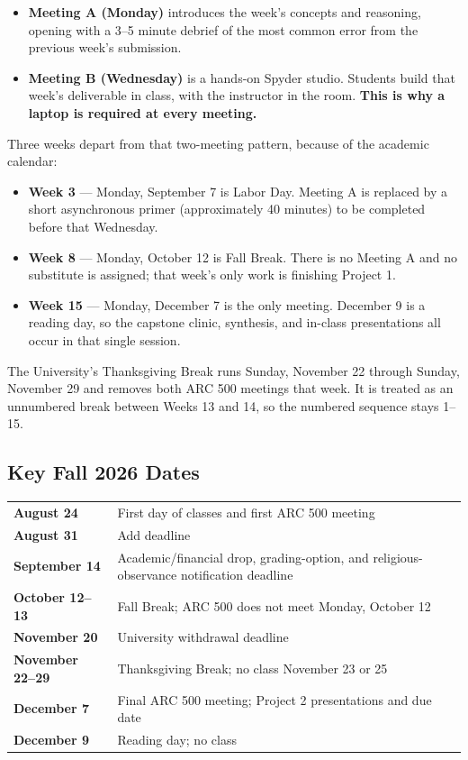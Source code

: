 \documentclass[11pt]{article}
\begin{document}
\begin{itemize}
  \item \textbf{Meeting A (Monday)} introduces the week's concepts and reasoning, opening with
        a 3--5 minute debrief of the most common error from the previous week's submission.
  \item \textbf{Meeting B (Wednesday)} is a hands-on Spyder studio. Students build that week's
        deliverable in class, with the instructor in the room. \textbf{This is why a laptop is
        required at every meeting.}
\end{itemize}

Three weeks depart from that two-meeting pattern, because of the academic calendar:

\begin{itemize}
  \item \textbf{Week 3} --- Monday, September 7 is Labor Day. Meeting A is replaced by a short
        asynchronous primer (approximately 40 minutes) to be completed before that Wednesday.
  \item \textbf{Week 8} --- Monday, October 12 is Fall Break. There is no Meeting A and no
        substitute is assigned; that week's only work is finishing Project 1.
  \item \textbf{Week 15} --- Monday, December 7 is the only meeting. December 9 is a reading
        day, so the capstone clinic, synthesis, and in-class presentations all occur in that
        single session.
\end{itemize}

\newpage
The University's Thanksgiving Break runs Sunday, November 22 through Sunday, November 29 and
removes both ARC 500 meetings that week. It is treated as an unnumbered break between Weeks 13
and 14, so the numbered sequence stays 1--15.

\subsection*{Key Fall 2026 Dates}

\begin{tabularx}{\textwidth}{@{}l X@{}}
  \textbf{August 24}   & First day of classes and first ARC 500 meeting \\
  \textbf{August 31}   & Add deadline \\
  \textbf{September 14}& Academic/financial drop, grading-option, and religious-observance
                          notification deadline \\
  \textbf{October 12--13} & Fall Break; ARC 500 does not meet Monday, October 12 \\
  \textbf{November 20} & University withdrawal deadline \\
  \textbf{November 22--29} & Thanksgiving Break; no class November 23 or 25 \\
  \textbf{December 7}  & Final ARC 500 meeting; Project 2 presentations and due date \\
  \textbf{December 9}  & Reading day; no class \\
\end{tabularx}
\end{document}
